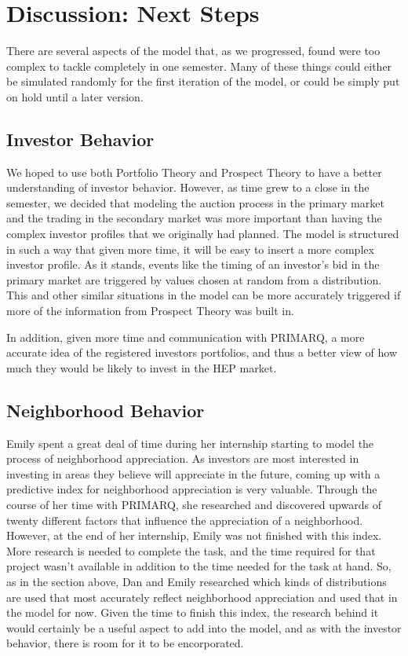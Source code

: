 \documentclass[twoside]{article}
\begin{document}
\section{Discussion: Next Steps}
There are several aspects of the model that, as we progressed, found were too complex to tackle completely in one semester. Many of these things could either be simulated randomly for the first iteration of the model, or could be simply put on hold until a later version. 

\subsection{Investor Behavior}
We hoped to use both Portfolio Theory and Prospect Theory to have a better understanding of investor behavior. However, as time grew to a close in the semester, we decided that modeling the auction process in the primary market and the trading in the secondary market was more important than having the complex investor profiles that we originally had planned. The model is structured in such a way that given more time, it will be easy to insert a more complex investor profile. As it stands, events like the timing of an investor's bid in the primary market are triggered by values chosen at random from a distribution. This and other similar situations in the model can be more accurately triggered if more of the information from Prospect Theory was built in.

In addition, given more time and communication with PRIMARQ, a more accurate idea of the registered investors portfolios, and thus a better view of how much they would be likely to invest in the HEP market. 

\subsection{Neighborhood Behavior}
Emily spent a great deal of time during her internship starting to model the process of neighborhood appreciation. As investors are most interested in investing in areas they believe will appreciate in the future, coming up with a predictive index for neighborhood appreciation is very valuable. Through the course of her time with PRIMARQ, she researched and discovered upwards of twenty different factors that influence the appreciation of a neighborhood. However, at the end of her internship, Emily was not finished with this index. More research is needed to complete the task, and the time required for that project wasn't available in addition to the time needed for the task at hand. So, as in the section above, Dan and Emily researched which kinds of distributions are used that most accurately reflect neighborhood appreciation and used that in the model for now. Given the time to finish this index, the research behind it would certainly be a useful aspect to add into the model, and as with the investor behavior, there is room for it to be encorporated.
\end{document}
